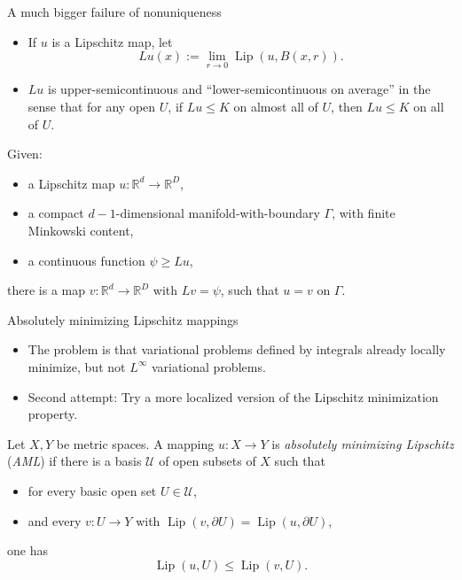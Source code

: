 \documentclass[10pt]{beamer}
\newcommand{\RR}{\mathbb{R}}
\DeclareMathOperator{\Lip}{Lip}
\begin{document}
\begin{frame}{A much bigger failure of nonuniqueness}
\begin{itemize}
\item If $u$ is a Lipschitz map, let
$$Lu(x) := \lim_{r \to 0} \Lip(u, B(x, r)).$$
\item $Lu$ is upper-semicontinuous and ``lower-semicontinuous on average'' in the sense that for any open $U$, if $Lu \leq K$ on almost all of $U$, then $Lu \leq K$ on all of $U$.
\end{itemize}

\begin{theorem}[B, Ze-An '24]
Given:
\begin{itemize}
\item a Lipschitz map $u: \RR^d \to \RR^D$,
\item a compact $d - 1$-dimensional manifold-with-boundary $\Gamma$, with finite Minkowski content,
\item a continuous function $\psi \geq Lu$,
\end{itemize}
there is a map $v: \RR^d \to \RR^D$ with $Lv = \psi$, such that $u = v$ on $\Gamma$.
\end{theorem}
    
\end{frame}

\begin{frame}{Absolutely minimizing Lipschitz mappings}
\begin{itemize}
\item The problem is that variational problems defined by integrals already locally minimize, but not $L^\infty$ variational problems. 
\item Second attempt: Try a more localized version of the Lipschitz minimization property. 
\end{itemize}

\begin{definition}
Let $X, Y$ be metric spaces.
A mapping $u: X \to Y$ is \emph{absolutely minimizing Lipschitz} (\emph{AML}) if there is a basis $\mathscr U$ of open subsets of $X$ such that
\begin{itemize}
\item for every basic open set $U \in \mathscr U$,
\item and every $v: U \to Y$ with $\Lip(v, \partial U) = \Lip(u, \partial U)$, 
\end{itemize}
one has
$$\Lip(u, U) \leq \Lip(v, U).$$
\end{definition}
\end{frame}
\end{document}
